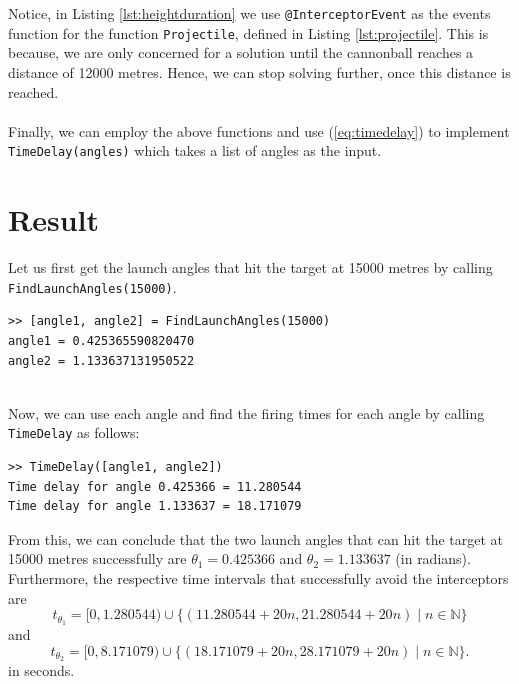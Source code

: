 \documentclass[11pt]{report}
\begin{document}


Notice, in Listing \ref{lst:heightduration} we use \texttt{@InterceptorEvent} as the events function for the function \texttt{Projectile}, defined in Listing \ref{lst:projectile}. This is because, we are only concerned for a solution until the cannonball reaches a distance of 12000 metres. Hence, we can stop solving further, once this distance is reached.\\


\ \\
Finally, we can employ the above functions and use (\ref{eq:timedelay}) to implement \texttt{TimeDelay(angles)} which takes a list of angles as the input. \\



\section{Result}
Let us first get the launch angles that hit the target at 15000 metres by calling \texttt{FindLaunchAngles(15000)}.

\begin{lstlisting}[title={Firing Angles (in radians) to hit target at 15000m.}]
>> [angle1, angle2] = FindLaunchAngles(15000)
angle1 = 0.425365590820470
angle2 = 1.133637131950522
\end{lstlisting}

\ \\
Now, we can use each angle and find the firing times for each angle by calling \texttt{TimeDelay} as follows:

\begin{lstlisting}[title={Time delays for both firing angles.}]
>> TimeDelay([angle1, angle2])
Time delay for angle 0.425366 = 11.280544
Time delay for angle 1.133637 = 18.171079
\end{lstlisting}

From this, we can conclude that the two launch angles that can hit the target at 15000 metres successfully are $\theta_1 = 0.425366$ and $\theta_2 = 1.133637$ (in radians). Furthermore, the respective time intervals that successfully avoid the interceptors are
 $$t_{\theta_1} = [0, 1.280544) \cup \{(11.280544 + 20n, 21.280544 + 20n) \mid n \in \mathbb{N}\}$$ 
 and
 $$t_{\theta_2} = [0, 8.171079) \cup  \{(18.171079 + 20n, 28.171079 + 20n) \mid n \in \mathbb{N}\}.$$
 in seconds.
\end{document}
